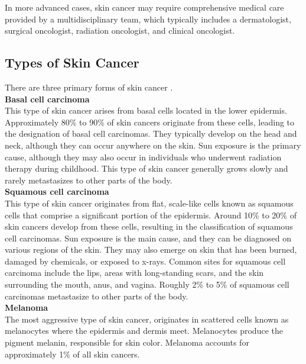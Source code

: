 In more advanced cases, skin cancer may require comprehensive medical care provided by a multidisciplinary team, which typically includes a dermatologist, surgical oncologist, radiation oncologist, and clinical oncologist.

\subsection{Types of Skin Cancer}

There are three primary forms of skin cancer \cite{BaseCancerKnowledge}. \\

\vspace{0.5cm}
\textbf{Basal cell carcinoma} \\

This type of skin cancer arises from basal cells located in the lower epidermis. Approximately 80\% to 90\% of skin cancers originate from these cells, leading to the designation of basal cell carcinomas. They typically develop on the head and neck, although they can occur anywhere on the skin. Sun exposure is the primary cause, although they may also occur in individuals who underwent radiation therapy during childhood. This type of skin cancer generally grows slowly and rarely metastasizes to other parts of the body. \\

\vspace{0.5cm}
\textbf{Squamous cell carcinoma} \\

This type of skin cancer originates from flat, scale-like cells known as squamous cells that comprise a significant portion of the epidermis. Around 10\% to 20\% of skin cancers develop from these cells, resulting in the classification of squamous cell carcinomas. Sun exposure is the main cause, and they can be diagnosed on various regions of the skin. They may also emerge on skin that has been burned, damaged by chemicals, or exposed to x-rays. Common sites for squamous cell carcinoma include the lips, areas with long-standing scars, and the skin surrounding the mouth, anus, and vagina. Roughly 2\% to 5\% of squamous cell carcinomas metastasize to other parts of the body. \\

\vspace{0.5cm}
\textbf{Melanoma} \\

The most aggressive type of skin cancer, originates in scattered cells known as melanocytes where the epidermis and dermis meet. Melanocytes produce the pigment melanin, responsible for skin color. Melanoma accounts for approximately 1\% of all skin cancers.


